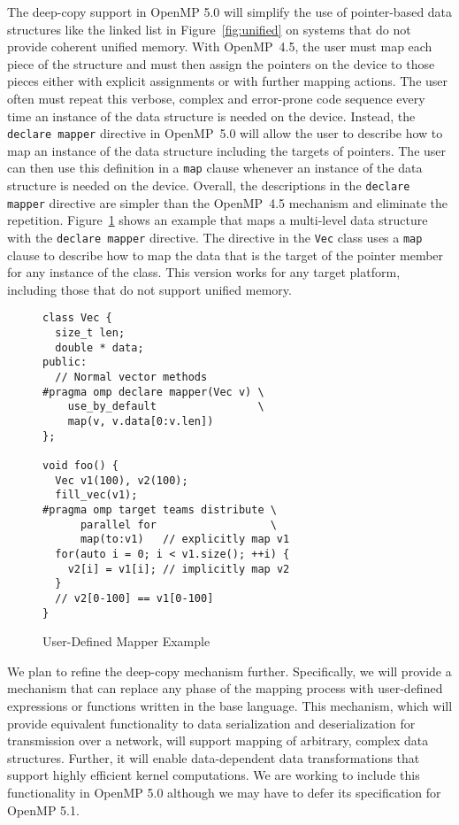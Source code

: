 The deep-copy support in OpenMP 5.0 will simplify the use of pointer-based 
data structures like the linked list in Figure~\ref{fig:unified} on systems 
that do not provide coherent unified memory. With OpenMP~4.5, the user must 
map each piece of the structure and must then assign the pointers on the 
device to those pieces either with explicit assignments or with further 
mapping actions. The user often must repeat this verbose, complex and 
error-prone code sequence every time an instance of the data structure is 
needed on the device. Instead, the \texttt{declare mapper} directive in 
OpenMP~5.0 will allow the user to describe how to map an instance of the 
data structure including the targets of pointers. The user can then use 
this definition in a \texttt{map} clause whenever an instance of the data 
structure is needed on the device. Overall, the descriptions in the 
\texttt{declare mapper} directive are simpler than the OpenMP~4.5 mechanism 
and eliminate the repetition. Figure~\ref{fig:mapper} shows an example that 
maps a multi-level data structure with the \texttt{declare mapper} directive.
The directive in  the \texttt{Vec} class uses a \texttt{map} clause to 
describe how to map the data that is the target of the pointer member for any 
instance of the class. This version works for any target platform, including 
those that do not support unified memory.

\begin{figure}
\begin{verbatim}
class Vec {
  size_t len;
  double * data;
public:
  // Normal vector methods
#pragma omp declare mapper(Vec v) \
    use_by_default                \
    map(v, v.data[0:v.len])
};

void foo() {
  Vec v1(100), v2(100);
  fill_vec(v1);
#pragma omp target teams distribute \
      parallel for                  \
      map(to:v1)   // explicitly map v1
  for(auto i = 0; i < v1.size(); ++i) { 
    v2[i] = v1[i]; // implicitly map v2
  }
  // v2[0-100] == v1[0-100]
}
\end{verbatim}
\caption{User-Defined Mapper Example\label{fig:mapper}}
\end{figure}

We plan to refine the deep-copy mechanism further. Specifically, we will 
provide a mechanism that can replace any phase of the mapping process with 
user-defined expressions or functions written in the base language. This 
mechanism, which will provide equivalent functionality to data  serialization 
and deserialization for transmission over a network,  will support mapping 
of arbitrary, complex data structures. Further, it will enable data-dependent 
data transformations that support highly efficient kernel computations. We
are working to include this functionality in OpenMP 5.0 although we may
have to defer its specification for OpenMP 5.1.




